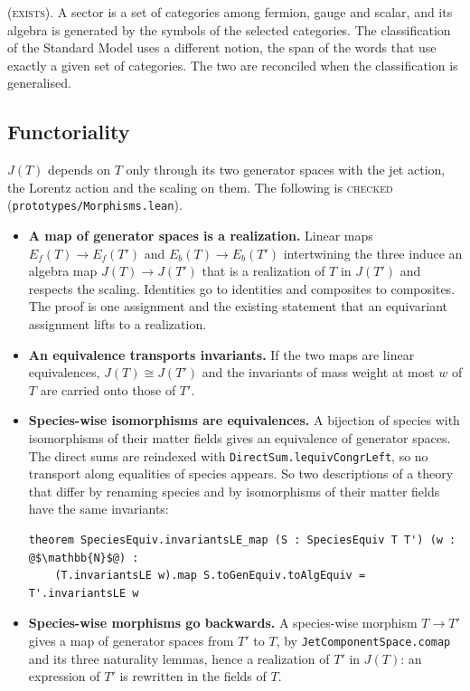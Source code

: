 \documentclass[11pt,a4paper]{article}
\makeatletter
\newcommand{\lean}[1]{{\footnotesize\upshape\ttfamily\nolinkurl{#1}}}
\newcommand{\file}[1]{{\small\ttfamily\nolinkurl{#1}}}
\newcommand{\stE}{\textsc{exists}}
\newcommand{\stC}{\textsc{checked}}
\renewcommand\paragraph{\@startsection{paragraph}{4}{\z@}{1.7ex \@plus .6ex \@minus .2ex}{-0.8em}{\normalfont\normalsize\bfseries}}
\makeatother
\begin{document}
\paragraph{Sectors} (\stE). A sector is a set of categories among fermion, gauge and scalar, and its algebra is generated by the symbols of the selected categories. The classification of the Standard Model uses a different notion, the span of the words that use exactly a given set of categories. The two are reconciled when the classification is generalised.

\subsection{Functoriality}\label{sec:functor}

$J(T)$ depends on $T$ only through its two generator spaces with the jet action, the Lorentz action and the scaling on them. The following is \stC{} (\file{prototypes/Morphisms.lean}).

\begin{itemize}[itemsep=2pt]
\item \textbf{A map of generator spaces is a realization.} Linear maps $E_f(T)\to E_f(T')$ and $E_b(T)\to E_b(T')$ intertwining the three induce an algebra map $J(T)\to J(T')$ that is a realization of $T$ in $J(T')$ and respects the scaling. Identities go to identities and composites to composites. The proof is one assignment and the existing statement that an equivariant assignment lifts to a realization.
\item \textbf{An equivalence transports invariants.} If the two maps are linear equivalences, $J(T)\cong J(T')$ and the invariants of mass weight at most $w$ of $T$ are carried onto those of $T'$.
\item \textbf{Species-wise isomorphisms are equivalences.} A bijection of species with isomorphisms of their matter fields gives an equivalence of generator spaces. The direct sums are reindexed with \lean{DirectSum.lequivCongrLeft}, so no transport along equalities of species appears. So two descriptions of a theory that differ by renaming species and by isomorphisms of their matter fields have the same invariants:
\begin{lstlisting}
theorem SpeciesEquiv.invariantsLE_map (S : SpeciesEquiv T T') (w : @$\mathbb{N}$@) :
    (T.invariantsLE w).map S.toGenEquiv.toAlgEquiv = T'.invariantsLE w
\end{lstlisting}
\item \textbf{Species-wise morphisms go backwards.} A species-wise morphism $T\to T'$ gives a map of generator spaces from $T'$ to $T$, by \lean{JetComponentSpace.comap} and its three naturality lemmas, hence a realization of $T'$ in $J(T)$: an expression of $T'$ is rewritten in the fields of $T$.
\end{itemize}
\end{document}
